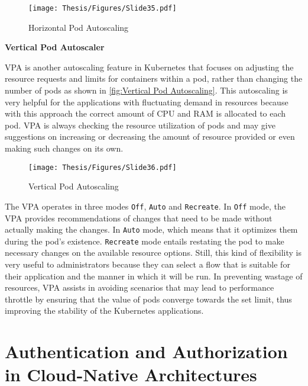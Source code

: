 \captionsetup{justification=centering}
\begin{figure}[h]
\centering
\texttt{[image: Thesis/Figures/Slide35.pdf]}
\caption{\label{fig:Horizontal Pod Autoscaling}Horizontal Pod Autoscaling \cite{Kubernetes_doc}}
\end{figure}


\clearpage

\textbf{Vertical Pod Autoscaler}

VPA is another autoscaling feature in Kubernetes that focuses on adjusting the resource requests and limits for containers within a pod, rather than changing the number of pods as shown in \autoref{fig:Vertical Pod Autoscaling}. This autoscaling is very helpful for the applications with fluctuating demand in resources because with this approach the correct amount of CPU and RAM is allocated to each pod. VPA is always checking the resource utilization of pods and may give suggestions on increasing or decreasing the amount of resource provided or even making such changes on its own. \cite{vertical_pod_autoscaler}

\captionsetup{justification=centering}
\begin{figure}[h]
\centering
\texttt{[image: Thesis/Figures/Slide36.pdf]}
\caption{\label{fig:Vertical Pod Autoscaling}Vertical Pod Autoscaling \cite{Kubernetes-vpa}}
\end{figure}

The VPA operates in three modes \texttt{Off}, \texttt{Auto} and \texttt{Recreate}. In \texttt{Off} mode, the VPA provides recommendations of changes that need to be made without actually making the changes. In \texttt{Auto} mode, which means that it optimizes them during the pod’s existence. \texttt{Recreate} mode entails restating the pod to make necessary changes on the available resource options. Still, this kind of flexibility is very useful to administrators because they can select a flow that is suitable for their application and the manner in which it will be run. In preventing wastage of resources, VPA assists in avoiding scenarios that may lead to performance throttle by ensuring that the value of pods converge towards the set limit, thus improving the stability of the Kubernetes applications. \cite{vertical_pod_autoscaler}




\section{Authentication and Authorization in Cloud-Native Architectures}

